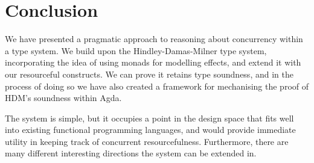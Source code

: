 \documentclass{report}
\begin{document}










\chapter{Conclusion}
We have presented a pragmatic approach to reasoning about concurrency within a
type system. We build upon the Hindley-Damas-Milner type system, incorporating
the idea of using monads for modelling effects, and extend it with our
resourceful constructs. We can prove it retains type soundness, and in the
process of doing so we have also created a framework for mechanising the proof
of HDM's soundness within Agda.

The system is simple, but it occupies a point in the design space that fits well
into existing functional programming languages, and would provide immediate
utility in keeping track of concurrent resourcefulness. Furthermore, there are
many different interesting directions the system can be extended in.





\end{document}
